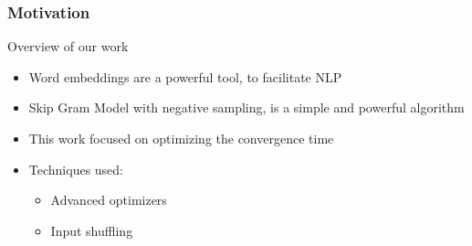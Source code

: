  \begin{frame}
 \frametitle{Motivation} 
 \begin{Large}
Overview of our work
 \end{Large}
 \bigskip
 \begin{itemize}
 \item Word embeddings are a powerful tool, to facilitate NLP
 \item Skip Gram Model with negative sampling, is a simple and powerful algorithm
 \item This work focused on optimizing the convergence time
 \item Techniques used: 
 \begin{itemize}
 \item Advanced optimizers
 \item Input shuffling
 \end{itemize}
 \end{itemize}
 \end{frame}
\iffalse
\begin{frame}\frametitle{Motivation}
\textbf{How can we encode vectors for machine learning? }\\
\bigskip 
\centerline{
He =$
\left(
\begin{array}{c}
\rowcolor{green! 20}
1\\
0\\
0\\
\end{array}\right)
$
is = $
\left(
\begin{array}{c}
0\\
\rowcolor{blue! 20}
1\\
0\\
\end{array}\right)
$
King =
$
\left(
\begin{array}{c}
0\\
0\\
\rowcolor{red! 20}
1\\
\end{array}\right)
$}
\bigskip
\begin{itemize}
    \item \texttt{PROBLEMS:}
    \begin{itemize}
    \item All vectors have the same distance to each other
    \item Very high dimension 
    \end{itemize}
\end{itemize}
\end{frame}
\begin{frame}\frametitle {Motivation}
    \framesubtitle{Why are word embeddings necessary?}
    \textbf{We need a new system to create word embeddings }
      \begin{itemize}
 \item $\Rightarrow $Skip-Gram Model  (Mikolov et al. 2013) \cite{mikolov}
 \item Low dimension
 \item Captures meaning
 \item Speeds up and improves other NLP tasks, for example machine translation. 
 \end{itemize}
  \end{frame}
  \fi

